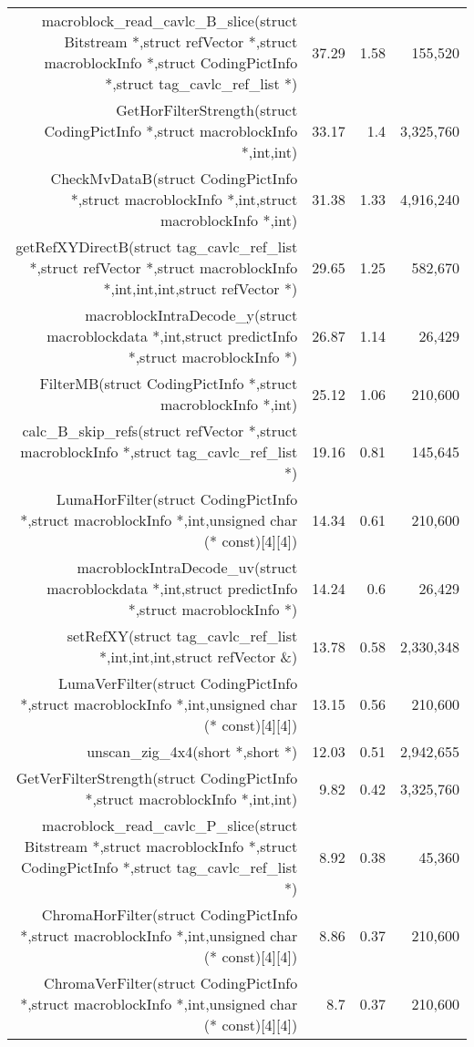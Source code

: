 \begin{table}[htbp]
\begin{tabular}{rrrr}
    macroblock\_read\_cavlc\_B\_slice(struct Bitstream *,struct refVector *,struct macroblockInfo *,struct CodingPictInfo *,struct tag\_cavlc\_ref\_list *) & 37.29 & 1.58  & 155,520 \\
    GetHorFilterStrength(struct CodingPictInfo *,struct macroblockInfo *,int,int) & 33.17 & 1.4   & 3,325,760 \\
    CheckMvDataB(struct CodingPictInfo *,struct macroblockInfo *,int,struct macroblockInfo *,int) & 31.38 & 1.33  & 4,916,240 \\
    getRefXYDirectB(struct tag\_cavlc\_ref\_list *,struct refVector *,struct macroblockInfo *,int,int,int,struct refVector *) & 29.65 & 1.25  & 582,670 \\
    macroblockIntraDecode\_y(struct macroblockdata *,int,struct predictInfo *,struct macroblockInfo *) & 26.87 & 1.14  & 26,429 \\
    FilterMB(struct CodingPictInfo *,struct macroblockInfo *,int) & 25.12 & 1.06  & 210,600 \\
    calc\_B\_skip\_refs(struct refVector *,struct macroblockInfo *,struct tag\_cavlc\_ref\_list *) & 19.16 & 0.81  & 145,645 \\
    LumaHorFilter(struct CodingPictInfo *,struct macroblockInfo *,int,unsigned char (* const)[4][4]) & 14.34 & 0.61  & 210,600 \\
    macroblockIntraDecode\_uv(struct macroblockdata *,int,struct predictInfo *,struct macroblockInfo *) & 14.24 & 0.6   & 26,429 \\
    setRefXY(struct tag\_cavlc\_ref\_list *,int,int,int,struct refVector \&) & 13.78 & 0.58  & 2,330,348 \\
    LumaVerFilter(struct CodingPictInfo *,struct macroblockInfo *,int,unsigned char (* const)[4][4]) & 13.15 & 0.56  & 210,600 \\
    unscan\_zig\_4x4(short *,short *) & 12.03 & 0.51  & 2,942,655 \\
    GetVerFilterStrength(struct CodingPictInfo *,struct macroblockInfo *,int,int) & 9.82  & 0.42  & 3,325,760 \\
    macroblock\_read\_cavlc\_P\_slice(struct Bitstream *,struct macroblockInfo *,struct CodingPictInfo *,struct tag\_cavlc\_ref\_list *) & 8.92  & 0.38  & 45,360 \\
    ChromaHorFilter(struct CodingPictInfo *,struct macroblockInfo *,int,unsigned char (* const)[4][4]) & 8.86  & 0.37  & 210,600 \\
    ChromaVerFilter(struct CodingPictInfo *,struct macroblockInfo *,int,unsigned char (* const)[4][4]) & 8.7   & 0.37  & 210,600 \\

\end{tabular}
\end{table}
